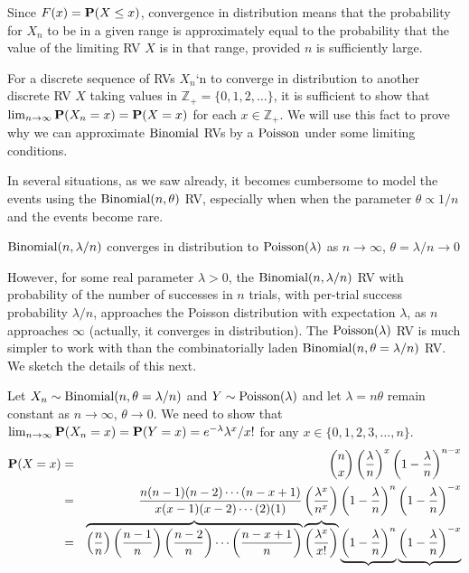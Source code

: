Since $F(x) = \mathbf{P}(X \leq x)$, convergence in distribution means that the probability for $X_n$ to be in a given range is approximately equal to the probability that the value of the limiting RV $X$ is in that range, provided $n$ is sufficiently large. 

For a discrete sequence of RVs $X_n$`n to converge in distribution to another discrete RV $X$ taking values in $\mathbb{Z}_+ = \{0,1,2,\ldots\}$, it is sufficient to show that $\lim_{n \to \infty}\mathbf{P}(X_n = x) = \mathbf{P}(X=x)$ for each $x \in \mathbb{Z_+}$.  
We will use this fact to prove why we can approximate $\mbox{{\rm Binomial}}$ RVs by a $\mbox{{\rm Poisson}}$ under some limiting conditions.

\begin{example}\label{EgBinomialConvergesInDistToPoisson}
In several situations, as we saw already, it becomes cumbersome to model the events using the $\mbox{{\rm Binomial}}(n,\theta)$ RV, especially when when the parameter $\theta \propto 1/n$ and the events become rare.  

\begin{center}
\begin{frame}
{$\mbox{{\rm Binomial}}(n,\lambda/n)$ converges in distribution to $\mbox{{\rm Poisson}}(\lambda)$ as $n \to \infty$, $\theta=\lambda/n \to 0$}
\end{frame}
\end{center}

However, for some real parameter $\lambda>0$, the $\mbox{{\rm Binomial}}(n,\lambda/n)$ RV with probability of the number of successes in $n$ trials, with per-trial success probability $\lambda/n$, approaches the Poisson distribution with expectation $\lambda$, as $n$ approaches $\infty$ (actually, it converges in distribution).  
The $\mbox{{\rm Poisson}}(\lambda)$ RV is much simpler to work with than the combinatorially laden $\mbox{{\rm Binomial}}(n,\theta=\lambda/n)$ RV.  We sketch the details of this next.

Let $X_n \sim \mbox{{\rm Binomial}}(n,\theta=\lambda/n)$ and $Y \sim \mbox{{\rm Poisson}}(\lambda)$ and let $\lambda=n\theta$ remain constant as  $n \to \infty$, $\theta \to 0$.  
We need to show that $\lim_{n \to \infty} \mathbf{P}(X_n=x) = \mathbf{P}(Y=x) = e^{-\lambda}\lambda^x/x!$ for any $x \in \{0,1,2,3,\ldots,n\}$. 
\begin{eqnarray}
\mathbf{P}(X=x)
&=&
\binom{n}{x} \left( \frac{\lambda}{n} \right)^x \left( 1- \frac{\lambda}{n} \right)^{n-x} \notag \\
&=& \frac{n(n-1)(n-2)\cdots(n-x+1)}{x(x-1)(x-2)\cdots (2)(1)}
\left( \frac{\lambda^x}{n^x} \right)
\left( 1- \frac{\lambda}{n} \right)^n
\left( 1- \frac{\lambda}{n} \right)^{-x} \notag \\
&=&
\overbrace{\left( \frac{n}{n} \right) \left( \frac{n-1}{n} \right) \left( \frac{n-2}{n} \right) \cdots \left( \frac{n-x+1}{n} \right)}
\overbrace{\left( \frac{\lambda^x}{x!} \right)}
\underbrace{\left( 1- \frac{\lambda}{n} \right)^n}
\underbrace{\left( 1- \frac{\lambda}{n} \right)^{-x}}  \notag \\
\end{eqnarray}


\end{example}

